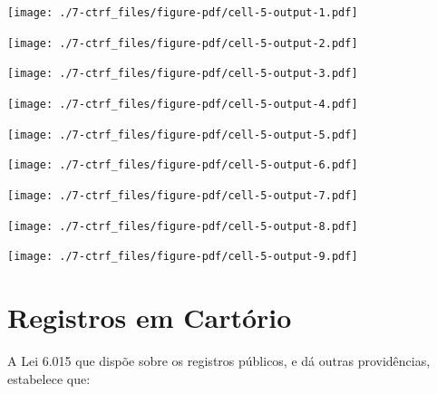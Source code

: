 \documentclass[
  letterpaper,
]{report}
\begin{document}
\texttt{[image: ./7-ctrf\_files/figure-pdf/cell-5-output-1.pdf]}

\texttt{[image: ./7-ctrf\_files/figure-pdf/cell-5-output-2.pdf]}

\texttt{[image: ./7-ctrf\_files/figure-pdf/cell-5-output-3.pdf]}

\texttt{[image: ./7-ctrf\_files/figure-pdf/cell-5-output-4.pdf]}

\texttt{[image: ./7-ctrf\_files/figure-pdf/cell-5-output-5.pdf]}

\texttt{[image: ./7-ctrf\_files/figure-pdf/cell-5-output-6.pdf]}

\texttt{[image: ./7-ctrf\_files/figure-pdf/cell-5-output-7.pdf]}

\texttt{[image: ./7-ctrf\_files/figure-pdf/cell-5-output-8.pdf]}

\texttt{[image: ./7-ctrf\_files/figure-pdf/cell-5-output-9.pdf]}


\hypertarget{registros-em-cartuxf3rio}{%
\chapter{Registros em Cartório}\label{registros-em-cartuxf3rio}}

A Lei 6.015 que dispõe sobre os registros públicos, e dá outras
providências, estabelece que:
\end{document}
